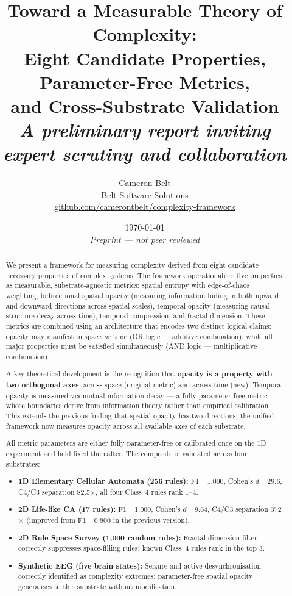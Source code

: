 \documentclass[12pt,a4paper]{article}
\title{\textbf{Toward a Measurable Theory of Complexity:\\
Eight Candidate Properties, Parameter-Free Metrics,\\
and Cross-Substrate Validation}\\[0.8em]
\large\textit{A preliminary report inviting expert scrutiny and collaboration}}
\author{Cameron Belt\\
\small Belt Software Solutions\\
\small \href{https://github.com/camerontbelt/complexity-framework}{github.com/camerontbelt/complexity-framework}}
\date{\today\\[0.3em]
\small\textit{Preprint --- not peer reviewed}}
\begin{document}
\maketitle

\begin{abstract}
\noindent
We present a framework for measuring complexity derived from eight
candidate necessary properties of complex systems.
The framework operationalises five properties as measurable,
substrate-agnostic metrics: spatial entropy with edge-of-chaos
weighting, bidirectional spatial opacity (measuring information
hiding in both upward and downward directions across spatial
scales), temporal opacity (measuring causal structure decay across
time), temporal compression, and fractal dimension.
These metrics are combined using an architecture that encodes two
distinct logical claims: opacity may manifest in space \emph{or}
time (OR logic --- additive combination), while all major properties
must be satisfied simultaneously (AND logic --- multiplicative
combination).

A key theoretical development is the recognition that
\textbf{opacity is a property with two orthogonal axes}: across
space (original metric) and across time (new).
Temporal opacity is measured via mutual information decay --- a
fully parameter-free metric whose boundaries derive from information
theory rather than empirical calibration.
This extends the previous finding that spatial opacity has two
directions; the unified framework now measures opacity across all
available axes of each substrate.

All metric parameters are either fully parameter-free or calibrated
once on the 1D experiment and held fixed thereafter.
The composite is validated across four substrates:

\begin{itemize}[noitemsep]
  \item \textbf{1D Elementary Cellular Automata (256 rules):}
    F1\,=\,1.000, Cohen's $d$\,=\,29.6, C4/C3 separation 82.5$\times$,
    all four Class~4 rules rank 1--4.
  \item \textbf{2D Life-like CA (17 rules):}
    F1\,=\,1.000, Cohen's $d$\,=\,9.64, C4/C3 separation 372$\times$
    (improved from F1\,=\,0.800 in the previous version).
  \item \textbf{2D Rule Space Survey (1,000 random rules):}
    Fractal dimension filter correctly suppresses space-filling rules;
    known Class~4 rules rank in the top 3.
  \item \textbf{Synthetic EEG (five brain states):}
    Seizure and active desynchronisation correctly identified as
    complexity extremes; parameter-free spatial opacity generalises
    to this substrate without modification.
\end{itemize}


\end{abstract}
\end{document}
